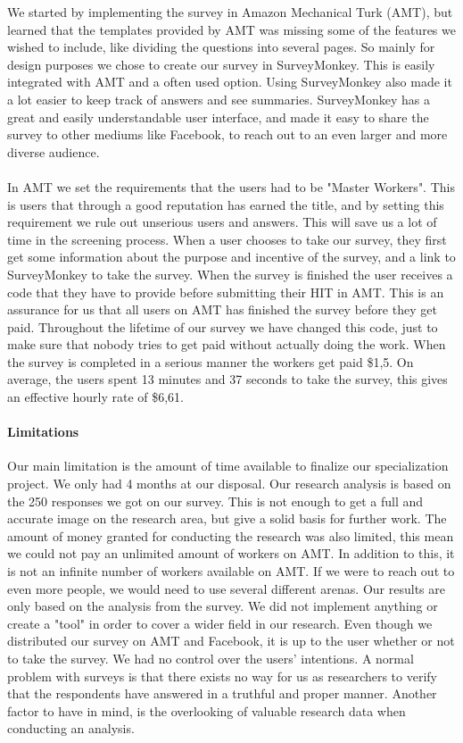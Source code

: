 We started by implementing the survey in Amazon Mechanical Turk (AMT), but learned that the templates provided by AMT was missing some of the features we wished to include, like dividing the questions into several pages. So mainly for design purposes we chose to create our survey in SurveyMonkey. This is easily integrated with AMT and a often used option.  Using SurveyMonkey also made it a lot easier to keep track of answers and see summaries. SurveyMonkey has a great and easily understandable user interface, and made it easy to share the survey to other mediums like Facebook, to reach out to an even larger and more diverse audience. 

\paragraph{}
In AMT we set the requirements that the users had to be "Master Workers". This is users that through a good reputation has earned the title, and by setting this requirement we rule out unserious users and answers. This will save us a lot of time in the screening process. When a user chooses to take our survey, they first get some information about the purpose and incentive of the survey, and a link to SurveyMonkey to take the survey. When the survey is finished the user receives a code that they have to provide before submitting their HIT in AMT. This is an assurance for us that all users on AMT has finished the survey before they get paid. Throughout the lifetime of our survey we have changed this code, just to make sure that nobody tries to get paid without actually doing the work. When the survey is completed in a serious manner the workers get paid \$1,5. On average, the users spent 13 minutes and 37 seconds to take the survey, this gives an effective hourly rate of \$6,61.    

\paragraph{Limitations} 
Our main limitation is the amount of time available to finalize our specialization project. We only had 4 months at our disposal. Our research analysis is based on the 250 responses we got on our survey. This is not enough to get a full and accurate image on the research area, but give a solid basis for further work. The amount of money granted for conducting the research was also limited, this mean we could not pay an unlimited amount of workers on AMT. In addition to this, it is not an infinite number of workers available on AMT. If we were to reach out to even more people, we would need to use several different arenas. Our results are only based on the analysis from the survey. We did not implement anything or create a "tool" in order to cover a wider field in our research. Even though we distributed our survey on AMT and Facebook, it is up to the user whether or not to take the survey. We had no control over the users' intentions. A normal problem with surveys is that there exists no way for us as researchers to verify that the respondents have answered in a truthful and proper manner. Another factor to have in mind, is the overlooking of valuable research data when conducting an analysis. 


